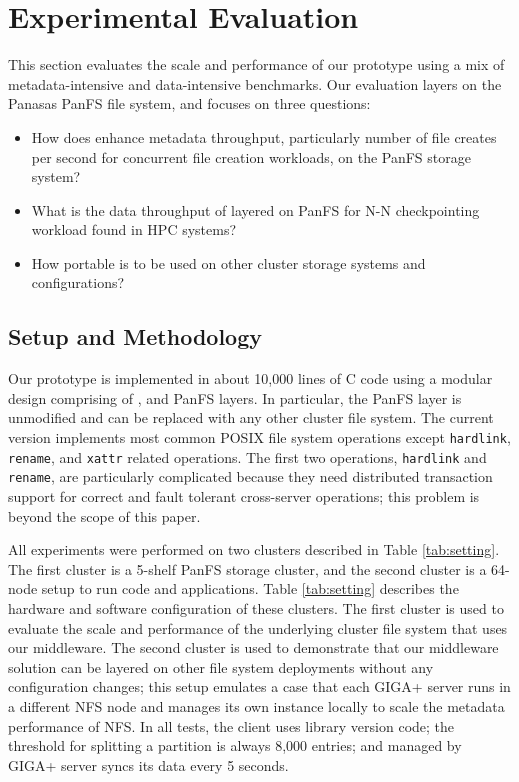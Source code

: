 \section{Experimental Evaluation}

This section evaluates the scale and performance of our prototype using a mix of
metadata-intensive and data-intensive benchmarks. Our evaluation layers \sys on
the Panasas PanFS file system, and focuses on three questions:
\begin{itemize}
\item How does \sys enhance metadata throughput, particularly
number of file creates per second for concurrent file creation workloads, on
the PanFS storage system?
\item What is the data throughput of \sys layered on PanFS for N-N checkpointing 
workload found in HPC systems?
\item How portable is \sys to be used on other cluster storage systems and
configurations?
\end{itemize}

\subsection{Setup and Methodology}

Our prototype is implemented in about 10,000 lines of C code using
a modular design comprising of \tfs, \ldb and PanFS layers. In particular, the
PanFS layer is unmodified and can be replaced with any other cluster file
system. The current version implements most common POSIX file system operations 
except \texttt{hardlink}, \texttt{rename}, and \texttt{xattr} related operations.
The first two operations, \texttt{hardlink} and \texttt{rename}, are
particularly complicated because they need distributed transaction support for
correct and fault tolerant cross-server operations; this problem is beyond the
scope of this paper.

All experiments were performed on two clusters described in Table
\ref{tab:setting}. The first cluster is a 5-shelf PanFS storage cluster, and the 
second cluster is a 64-node setup to run \sys code and applications.
Table \ref{tab:setting} describes the hardware and software configuration of
these clusters.
The first cluster is used to evaluate the scale and performance of the
underlying cluster file system that uses our middleware.
The second cluster is used to demonstrate that our middleware 
solution can be layered on other file system deployments without any
configuration changes; this setup
emulates a case that each GIGA+ server runs in a different NFS node and manages 
its own \tfs instance locally to scale the metadata performance of NFS.
In all tests, the client uses library version code;
the threshold for splitting a partition is always 8,000 entries;
and \tfs managed by GIGA+ server syncs its data every 5 seconds.

